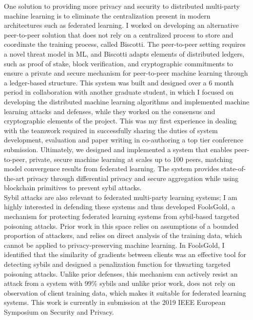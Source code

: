 \documentclass[10pt]{article} %
\begin{document}
One solution to providing more privacy and security to distributed multi-party machine learning is to eliminate the centralization present in modern architectures such as federated learning. I worked on developing an alternative peer-to-peer solution that does not rely on a centralized process to store and coordinate the training process, called Biscotti. 
%
The peer-to-peer setting requires a novel threat model in ML, and Biscotti adapts elements of distributed ledgers, such as proof of stake, block verification, and cryptographic commitments to ensure a private and secure mechanism for peer-to-peer machine learning through a ledger-based structure. This system was built and designed over a 6 month period in collaboration with another graduate student, in which I focused on developing the distributed machine learning algorithms and implemented machine learning attacks and defenses, while they worked on the consensus and cryptographic elements of the project. This was my first experience in dealing with the teamwork required in successfully sharing the duties of system development, evaluation and paper writing in co-authoring a top tier conference submission. Ultimately, we designed and implemented a system that enables peer-to-peer, private, secure machine learning at scales up to 100 peers, matching model convergence results from federated learning. The system provides state-of-the-art privacy through differential privacy and secure aggregation while using blockchain primitives to prevent sybil attacks.\\

Sybil attacks are also relevant to federated multi-party learning systems; I am highly interested in defending these systems and thus developed FoolsGold, a mechanism for protecting federated learning systems from sybil-based targeted poisoning attacks. Prior work in this space relies on assumptions of a bounded proportion of attackers, and relies on direct analysis of the training data, which cannot be applied to privacy-preserving machine learning. In FoolsGold, I identified that the similarity of gradients between clients was an effective tool for detecting sybils and designed a penalization function for thwarting targeted poisoning attacks. Unlike prior defenses, this mechanism can actively resist an attack from a system with 99\% sybils and unlike prior work, does not rely on observation of client training data, which makes it suitable for federated learning systems. This work is currently in submission at the 2019 IEEE European Symposium on Security and Privacy. \\
\end{document}
